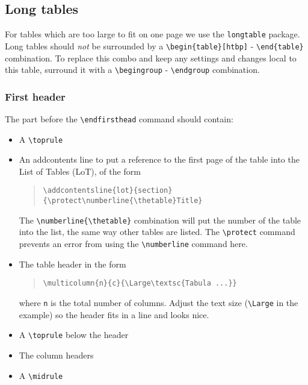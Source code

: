 \documentclass{report}
\begin{document}
\subsection{Long tables}
For tables which are too large to fit on one page we use the \verb+longtable+
package.
Long tables should \emph{not} be surrounded by a
\verb+\begin{table}[htbp]+ - \verb+\end{table}+ combination.
To replace this combo and keep any settings and changes local to this table,
surround it with a \verb+\begingroup+ - \verb+\endgroup+ combination.

\subsubsection{First header}
The part before the \verb+\endfirsthead+ command should contain:
\begin{itemize}
\item A \verb+\toprule+
\item An addcontents line to put a reference to the first page of the table
into the List of Tables (LoT), of the form
\begin{quote}
\verb+\addcontentsline{lot}{section}{\protect\numberline{\thetable}Title}+
\end{quote}
The \verb+\numberline{\thetable}+ combination will put the number of the
table into the list, the same way other tables are listed.
The \verb+\protect+ command prevents an error from using the \verb+\numberline+
command here.
\item The table header in the form
\begin{quote}
\verb+\multicolumn{n}{c}{\Large\textsc{Tabula ...}}+
\end{quote}
where \verb+n+ is the total number of columns. Adjust the text size
(\verb+\Large+ in the example) so the header fits in a line and looks nice.
\item A \verb+\toprule+ below the header
\item The column headers
\item A \verb+\midrule+
\end{itemize}

\end{document}
